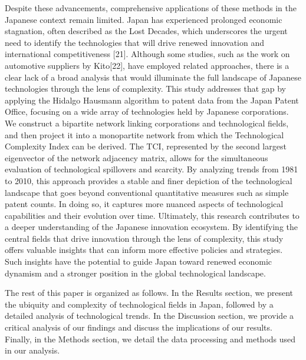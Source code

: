 \documentclass[fleqn,10pt]{wlscirep}
\begin{document}
Despite these advancements, comprehensive applications of these methods in the Japanese context remain limited. Japan has experienced prolonged economic stagnation, often described as the Lost Decades, which underscores the urgent need to identify the technologies that will drive renewed innovation and international competitiveness [21]. Although some studies, such as the work on automotive suppliers by Kito[22], have employed related approaches, there is a clear lack of a broad analysis that would illuminate the full landscape of Japanese technologies through the lens of complexity.
This study addresses that gap by applying the Hidalgo Hausmann algorithm to patent data from the Japan Patent Office, focusing on a wide array of technologies held by Japanese corporations. We construct a bipartite network linking corporations and technological fields, and then project it into a monopartite network from which the Technological Complexity Index can be derived. The TCI, represented by the second largest eigenvector of the network adjacency matrix, allows for the simultaneous evaluation of technological spillovers and scarcity. By analyzing trends from 1981 to 2010, this approach provides a stable and finer depiction of the technological landscape that goes beyond conventional quantitative measures such as simple patent counts. In doing so, it captures more nuanced aspects of technological capabilities and their evolution over time.
Ultimately, this research contributes to a deeper understanding of the Japanese innovation ecosystem. By identifying the central fields that drive innovation through the lens of complexity, this study offers valuable insights that can inform more effective policies and strategies. Such insights have the potential to guide Japan toward renewed economic dynamism and a stronger position in the global technological landscape.

The rest of this paper is organized as follows. In the Results section, we present the ubiquity and complexity of technological fields in Japan, followed by a detailed analysis of technological trends. In the Discussion section, we provide a critical analysis of our findings and discuss the implications of our results. 
Finally, in the Methods section, we detail the data processing and methods used in our analysis.

\end{document}
